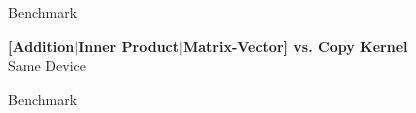 \begin{frame}{Benchmark}
  \begin{center} \textbf{ [Addition$|$Inner Product$|$Matrix-Vector] vs. Copy Kernel }\\[1em] Same Device \end{center}
\end{frame}

\begin{frame}{Benchmark}

\end{frame}
